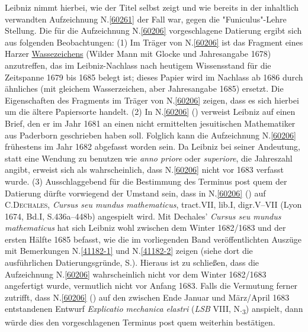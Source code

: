 Leibniz nimmt hierbei, wie der Titel selbst zeigt und wie bereits in der inhaltlich verwandten Aufzeichnung N.\ref{60261} der Fall war, gegen die "Funiculus"-Lehre Stellung.
Die für die Aufzeichnung N.\;\ref{60206} vorgeschlagene Datierung ergibt sich aus folgenden Beobachtungen:
\pend%
\pstart%
(1)
Im Träger von N.\;\ref{60206} ist das Fragment eines Harzer \href{\Scan{LH_37_03_117wz}}{Wassezeichens} (Wilder Mann mit Glocke und Jahresangabe 1678) anzutreffen, %
das im Leibniz-Nachlass nach heutigem Wissensstand %
für die Zeitspanne 1679 bis 1685 belegt ist;
dieses Papier wird im Nachlass ab 1686 durch ähnliches (mit gleichem Wasserzeichen, aber Jahresangabe 1685) ersetzt.
Die Eigenschaften des Fragments im Träger von N.\;\ref{60206} zeigen, dass es sich hierbei um die ältere Papiersorte handelt. %
\pend%
\pstart%
(2)
In N.\;\ref{60206} () verweist Leibniz auf einen Brief, den er im Jahr 1681 an einen nicht ermittelten jesuitischen Mathematiker aus Paderborn geschrieben haben soll.
Folglich kann die Aufzeichnung N.\;\ref{60206} frühestens im Jahr 1682 abgefasst worden sein.
Da Leibniz bei seiner Andeutung, statt eine Wendung zu benutzen wie \textit{anno priore} oder \textit{superiore}, die Jahreszahl angibt, erweist sich als wahrscheinlich, dass N.\;\ref{60206} nicht vor 1683 verfasst wurde.
\pend%
\pstart%
(3)
Ausschlaggebend für die Bestimmung des Terminus post quem der Datierung dürfte vorwiegend der Umstand sein, dass in N.\;\ref{60206} () auf \textsc{C.\;Dechales}, \textit{Cursus seu mundus mathematicus},
tract.\;VII, lib.\;I, digr.\;V--VII (Lyon 1674, Bd.\;I, S.\;436a--448b)\cite{00124} angespielt wird.
Mit Dechales' \textit{Cursus seu mundus mathematicus}\cite{00124} hat sich Leibniz wohl zwischen dem Winter 1682/1683 und der ersten Hälfte 1685 befasst, wie die im vorliegenden Band veröffentlichten Auszüge mit Bemerkungen N.\;\ref{41182-1} und N.\;\ref{41182-2} zeigen (siehe dort die ausführlichen Datierungsgründe, S.\;\pageref{41182_dat}).
Hieraus ist zu schließen, dass die Aufzeichnung N.\;\ref{60206} wahrscheinlich nicht vor dem Winter 1682/1683 angefertigt wurde, vermutlich nicht vor Anfang 1683.
Falls die Vermutung ferner zutrifft, dass N.\;\ref{60206} () auf den zwischen Ende Januar und März\:/\:April 1683 entstandenen Entwurf \textit{Explicatio mechanica elastri} (\textit{LSB} VIII, N.\textsubscript{3})\cite{01437} anspielt, dann würde dies den vorgeschlagenen Terminus post quem weiterhin bestätigen.

